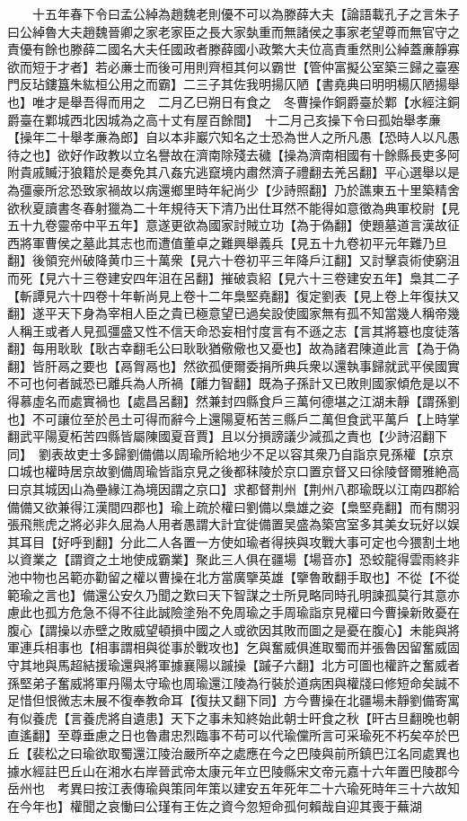 　　十五年春下令曰孟公綽為趙魏老則優不可以為滕薛大夫【論語載孔子之言朱子曰公綽魯大夫趙魏晉卿之家老家臣之長大家埶重而無諸侯之事家老望尊而無官守之責優有餘也滕薛二國名大夫任國政者滕薛國小政繁大夫位高責重然則公綽蓋亷靜寡欲而短于才者】若必亷士而後可用則齊桓其何以霸世【管仲富擬公室築三歸之臺塞門反玷鏤簋朱紘桓公用之而霸】二三子其佐我明揚仄陋【書堯典曰明明楊仄陋揚舉也】唯才是舉吾得而用之　二月乙巳朔日有食之　冬曹操作銅爵臺於鄴【水經注銅爵臺在鄴城西北因城為之高十丈有屋百餘間】　十二月己亥操下令曰孤始舉孝亷【操年二十舉孝亷為郎】自以本非巖穴知名之士恐為世人之所凡愚【恐時人以凡愚待之也】欲好作政教以立名譽故在濟南除殘去穢【操為濟南相國有十餘縣長吏多阿附貴戚贓汙狼籍於是奏免其八姦宄逃竄境内肅然濟子禮翻去羌呂翻】平心選舉以是為彊豪所忿恐致家禍故以病還鄉里時年紀尚少【少詩照翻】乃於譙東五十里築精舍欲秋夏讀書冬春射獵為二十年規待天下清乃出仕耳然不能得如意徵為典軍校尉【見五十九卷靈帝中平五年】意遂更欲為國家討賊立功【為于偽翻】使題墓道言漢故征西將軍曹侯之墓此其志也而遭值董卓之難興舉義兵【見五十九卷初平元年難乃旦翻】後領兖州破降黄巾三十萬衆【見六十卷初平三年降戶江翻】又討擊袁術使窮沮而死【見六十三卷建安四年沮在呂翻】摧破袁紹【見六十三卷建安五年】梟其二子【斬譚見六十四卷十年斬尚見上卷十二年梟堅堯翻】復定劉表【見上卷上年復扶又翻】遂平天下身為宰相人臣之貴已極意望已過矣設使國家無有孤不知當幾人稱帝幾人稱王或者人見孤彊盛又性不信天命恐妄相忖度言有不遜之志【言其將簒也度徒落翻】每用耿耿【耿古幸翻毛公曰耿耿猶儆儆也又憂也】故為諸君陳道此言【為于偽翻】皆肝鬲之要也【鬲胷鬲也】然欲孤便爾委捐所典兵衆以還執事歸就武平侯國實不可也何者誠恐已離兵為人所禍【離力智翻】既為子孫計又已敗則國家傾危是以不得慕虛名而處實禍也【處昌呂翻】然兼封四縣食戶三萬何德堪之江湖未靜【謂孫劉也】不可讓位至於邑土可得而辭今上還陽夏柘苦三縣戶二萬但食武平萬戶【上時掌翻武平陽夏柘苦四縣皆屬陳國夏音賈】且以分損謗議少減孤之責也【少詩沼翻下同】　劉表故吏士多歸劉備備以周瑜所給地少不足以容其衆乃自詣京見孫權【京京口城也權時居京故劉備周瑜皆詣京見之後都秣陵於京口置京督又曰徐陵督爾雅絶高曰京其城因山為壘緣江為境因謂之京口】求都督荆州【荆州八郡瑜既以江南四郡給備備又欲兼得江漢間四郡也】瑜上疏於權曰劉備以梟雄之姿【梟堅堯翻】而有關羽張飛熊虎之將必非久屈為人用者愚謂大計宜徙備置吴盛為築宫室多其美女玩好以娱其耳目【好呼到翻】分此二人各置一方使如瑜者得挾與攻戰大事可定也今猥割土地以資業之【謂資之土地使成霸業】聚此三人俱在疆場【場音亦】恐蛟龍得雲雨終非池中物也呂範亦勸留之權以曹操在北方當廣擥英雄【擥魯敢翻手取也】不從【不從範瑜之言也】備還公安久乃聞之歎曰天下智謀之士所見略同時孔明諫孤莫行其意亦慮此也孤方危急不得不往此誠險塗殆不免周瑜之手周瑜詣京見權曰今曹操新敗憂在腹心【謂操以赤壁之敗威望頓損中國之人或欲因其敗而圖之是憂在腹心】未能與將軍連兵相事也【相事謂相與從事於戰攻也】乞與奮威俱進取蜀而并張魯因留奮威固守其地與馬超結援瑜還與將軍據襄陽以䠞操【䠞子六翻】北方可圖也權許之奮威者孫堅弟子奮威將軍丹陽太守瑜也周瑜還江陵為行裝於道病困與權牋曰修短命矣誠不足惜但恨微志未展不復奉教命耳【復扶又翻下同】方今曹操在北疆場未靜劉備寄寓有似養虎【言養虎將自遺患】天下之事未知終始此朝士旰食之秋【旰古旦翻晚也朝直遙翻】至尊垂慮之日也魯肅忠烈臨事不苟可以代瑜儻所言可采瑜死不朽矣卒於巴丘【裴松之曰瑜欲取蜀還江陵治嚴所卒之處應在今之巴陵與前所鎮巴江名同處異也據水經註巴丘山在湘水右岸晉武帝太康元年立巴陵縣宋文帝元嘉十六年置巴陵郡今岳州也　考異曰按江表傳瑜與策同年策以建安五年死年二十六瑜死時年三十六故知在今年也】權聞之哀慟曰公瑾有王佐之資今忽短命孤何賴哉自迎其喪于蕪湖